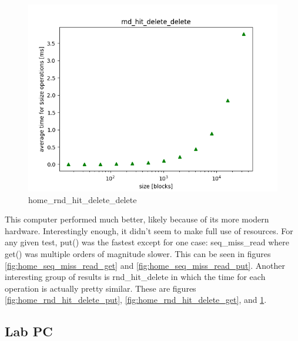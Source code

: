 \documentclass[twocolumn,11pt]{article}
\begin{document}
\begin{figure}[h!]
  \includegraphics[width=\linewidth]{Pictures/HOMEPC/rnd_hit_delete_complete_delete.png}
  \caption{home\_rnd\_hit\_delete\_delete}
  \label{fig:home_rnd_hit_delete_delete}
\end{figure}

This computer performed much better, likely because of its more modern hardware.
Interestingly enough, it didn't seem to make full use of resources. For any
given test, put() was the fastest except for one case: seq\_miss\_read where
get() was multiple orders of magnitude slower. This can be seen in figures
\ref{fig:home_seq_miss_read_get} and \ref{fig:home_seq_miss_read_put}. Another
interesting group of results is rnd\_hit\_delete in which the time for each
operation is actually pretty similar. These are figures
\ref{fig:home_rnd_hit_delete_put}, \ref{fig:home_rnd_hit_delete_get}, and
\ref{fig:home_rnd_hit_delete_delete}.

\subsection{Lab PC}
\end{document}
